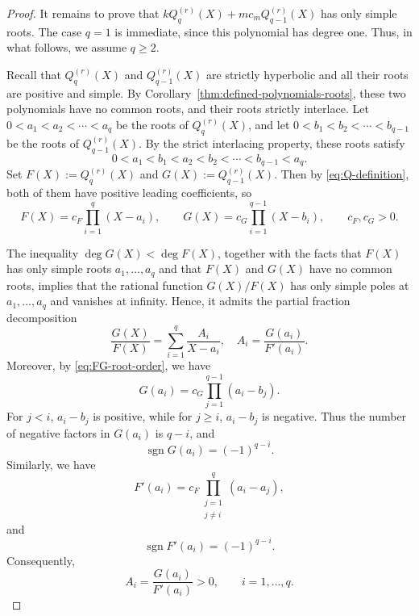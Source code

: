 \documentclass[preprint,3p,10pt]{elsarticle}
\theoremstyle{definition}
\begin{document}
\begin{proof}
It remains to prove that \(kQ_q^{(r)}(X)+mc_mQ_{q-1}^{(r)}(X)\) has only simple
roots. The case $q=1$ is immediate, since this polynomial has degree one. Thus, in what follows,
we assume $q\geq2.$


Recall that \(Q_q^{(r)}(X)\) and
\(Q_{q-1}^{(r)}(X)\) are strictly hyperbolic and all their roots are positive and simple. By Corollary~\ref{thm:defined-polynomials-roots}, these two polynomials have no common roots, and their roots strictly interlace. Let \(0<a_1<a_2<\cdots<a_q\) be the roots of \(Q_q^{(r)}(X)\), and let \(0<b_1<b_2<\cdots<b_{q-1}\) be the roots of \(Q_{q-1}^{(r)}(X)\). By the strict interlacing property, these roots satisfy \begin{equation}\label{eq:FG-root-order} 0<a_1<b_1<a_2<b_2<\cdots<b_{q-1}<a_q. 
\end{equation}
Set \(F(X):=Q_q^{(r)}(X)\) and \(G(X):=Q_{q-1}^{(r)}(X)\). Then by
\eqref{eq:Q-definition}, both of them have positive leading coefficients, so
\begin{equation}
    F(X)=c_F\prod_{i=1}^{q}(X-a_i),
    \qquad G(X)=c_G\prod_{i=1}^{q-1}(X-b_i),
    \qquad c_F,c_G>0.
\end{equation}

The inequality \(\deg G(X)<\deg F(X)\), together with the facts that \(F(X)\) has only simple roots \(a_1,\ldots,a_q\) and that \(F(X)\) and \(G(X)\) have no common roots, implies that the rational function \(G(X)/F(X)\) has only simple poles at \(a_1,\ldots,a_q\) and vanishes at infinity. Hence, it admits the partial fraction decomposition
\begin{equation}\label{eq:partial-fraction}
    \frac{G(X)}{F(X)}
    =
    \sum_{i=1}^{q}\frac{A_i}{X-a_i}, \quad A_i=\frac{G(a_i)}{F'(a_i)}.
\end{equation}
Moreover, by \eqref{eq:FG-root-order}, we have
\begin{equation}
    G(a_i)
    =
    c_G\prod_{j=1}^{q-1}(a_i-b_j).
\end{equation}
For \(j<i\), \(a_i-b_j\) is positive, while for \(j\geq i\), \(a_i-b_j\) is negative. Thus the number of negative factors in \(G(a_i)\)
is \(q-i\), and
\begin{equation}
    \operatorname{sgn}G(a_i)=(-1)^{q-i}.
\end{equation}
Similarly, we have
\begin{equation}
    F'(a_i)
    =
    c_F\prod_{\substack{j=1\\j\neq i}}^{q}(a_i-a_j),
\end{equation}
and
\begin{equation}
    \operatorname{sgn}F'(a_i)=(-1)^{q-i}.
\end{equation}
Consequently,
\begin{equation}
    A_i=\frac{G(a_i)}{F'(a_i)}>0,
    \qquad i=1,\ldots,q.
\end{equation}


\end{proof}
\end{document}
